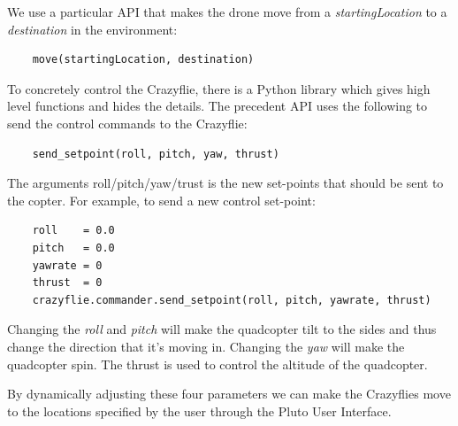 We use a particular API that makes the drone move from a \textit{startingLocation} to a \textit{destination} in the environment:
\\

\begin{lstlisting}
	move(startingLocation, destination)
\end{lstlisting}

To concretely control the Crazyflie, there is a Python library which gives high level functions and hides the details.
The precedent API uses the following to send the control commands to the Crazyflie:

\begin{lstlisting}
	send_setpoint(roll, pitch, yaw, thrust)
\end{lstlisting}

The arguments roll/pitch/yaw/trust is the new set-points that should be sent to the copter.
For example, to send a new control set-point:
\\

\begin{lstlisting}
	roll    = 0.0
    pitch   = 0.0
    yawrate = 0
    thrust  = 0
    crazyflie.commander.send_setpoint(roll, pitch, yawrate, thrust)
\end{lstlisting}

Changing the \textit{roll} and \textit{pitch} will make the quadcopter tilt to the sides and thus change the direction that it's moving in.
Changing the \textit{yaw} will make the quadcopter spin.
The thrust is used to control the altitude of the quadcopter.

By dynamically adjusting these four parameters we can make the Crazyflies move to the locations specified by the user through the Pluto User Interface.